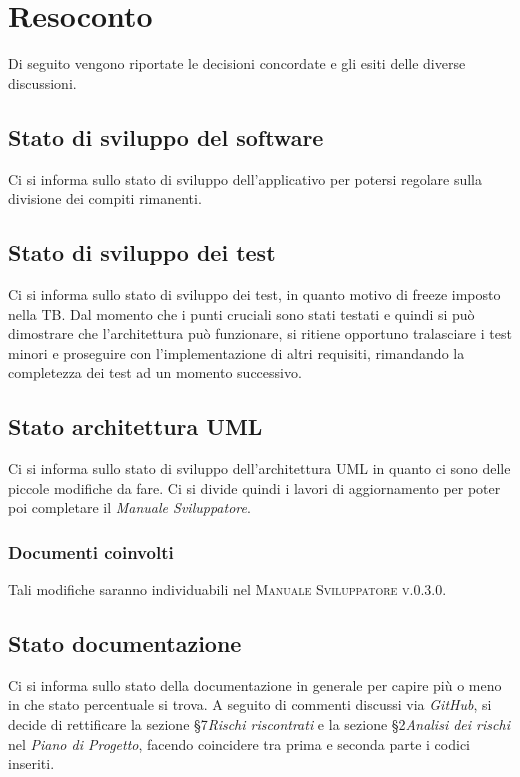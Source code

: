 \documentclass{article}
\begin{document}
\newpage
\section{Resoconto}
\label{sec:resoconto}

Di seguito vengono riportate le decisioni concordate e gli esiti delle diverse discussioni.

\subsection{Stato di sviluppo del software}
\label{itm:1}

Ci si informa sullo stato di sviluppo dell'applicativo per potersi regolare sulla divisione dei compiti rimanenti.


\subsection{Stato di sviluppo dei test}
\label{itm:2}

Ci si informa sullo stato di sviluppo dei test, in quanto motivo di freeze imposto nella TB. Dal momento che i punti cruciali sono stati testati e quindi si può dimostrare
che l'architettura può funzionare, si ritiene opportuno tralasciare i test minori e proseguire con l'implementazione di altri requisiti, rimandando la completezza dei test 
ad un momento successivo. 


\subsection{Stato architettura UML}
\label{itm:3}

Ci si informa sullo stato di sviluppo dell'architettura UML in quanto ci sono delle piccole modifiche da fare. Ci si divide quindi i lavori di aggiornamento per poter 
poi completare il \emph{Manuale Sviluppatore}.

\subsubsection*{Documenti coinvolti}
Tali modifiche saranno individuabili nel \textsc{Manuale Sviluppatore v.0.3.0}.


\subsection{Stato documentazione}
\label{itm:4}

Ci si informa sullo stato della documentazione in generale per capire più o meno in che stato percentuale si trova. A seguito di commenti discussi via \emph{GitHub}, 
si decide di rettificare la sezione \S7\emph{Rischi riscontrati} e la sezione \S2\emph{Analisi dei rischi} nel \emph{Piano di Progetto}, facendo coincidere tra prima e seconda
parte i codici inseriti. 
\end{document}
